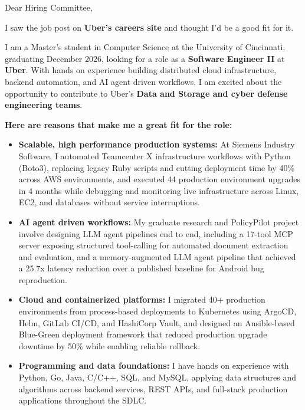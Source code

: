 \documentclass[11pt]{letter}
\date{}
\begin{document}
\begin{letter}{}

\opening{Dear Hiring Committee,}

I saw the job post on \textbf{Uber's careers site} and thought I'd be a good fit for it.

I am a Master's student in Computer Science at the University of Cincinnati, graduating December 2026, looking for a role as a \textbf{Software Engineer II} at \textbf{Uber}. With hands on experience building distributed cloud infrastructure, backend automation, and AI agent driven workflows, I am excited about the opportunity to contribute to Uber's \textbf{Data and Storage and cyber defense engineering teams}.

\textbf{Here are reasons that make me a great fit for the role:}

\begin{itemize}[leftmargin=*, itemsep=0.45em]
    \item \textbf{Scalable, high performance production systems:} At Siemens Industry Software, I automated Teamcenter X infrastructure workflows with Python (Boto3), replacing legacy Ruby scripts and cutting deployment time by 40\% across AWS environments, and executed 44 production environment upgrades in 4 months while debugging and monitoring live infrastructure across Linux, EC2, and databases without service interruptions.

    \item \textbf{AI agent driven workflows:} My graduate research and PolicyPilot project involve designing LLM agent pipelines end to end, including a 17-tool MCP server exposing structured tool-calling for automated document extraction and evaluation, and a memory-augmented LLM agent pipeline that achieved a 25.7x latency reduction over a published baseline for Android bug reproduction.

    \item \textbf{Cloud and containerized platforms:} I migrated 40+ production environments from process-based deployments to Kubernetes using ArgoCD, Helm, GitLab CI/CD, and HashiCorp Vault, and designed an Ansible-based Blue-Green deployment framework that reduced production upgrade downtime by 50\% while enabling reliable rollback.

    \item \textbf{Programming and data foundations:} I have hands on experience with Python, Go, Java, C/C++, SQL, and MySQL, applying data structures and algorithms across backend services, REST APIs, and full-stack production applications throughout the SDLC.


\end{itemize}
\end{letter}
\end{document}
